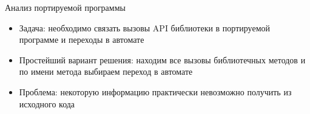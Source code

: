 \documentclass[12pt]{beamer}
\begin{document}

{
\begin{frame}{Анализ портируемой программы}
  \begin{mybox}[]
  \begin{itemize}
  	\item Задача: необходимо связать вызовы API библиотеки в портируемой программе и переходы в автомате
  	\item Простейший вариант решения: находим все вызовы библиотечных методов и по имени метода выбираем переход в автомате
  	\item Проблема: некоторую информацию практически невозможно получить из исходного кода
  \end{itemize}
  \end{mybox}
\end{frame}
}
\end{document}
